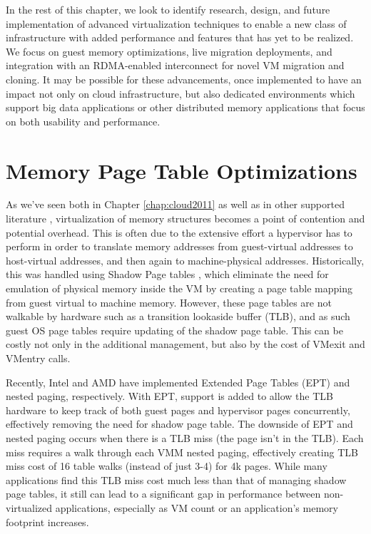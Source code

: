 In the rest of this chapter, we look to identify research, design, and future implementation of advanced virtualization techniques to enable a new class of infrastructure with added performance and features that has yet to be realized.  We focus on guest memory optimizations, live migration deployments, and integration with an RDMA-enabled interconnect for novel VM migration and cloning.  It may be possible for these advancements, once implemented to have an impact not only on cloud infrastructure, but also dedicated environments which support big data applications or other distributed memory applications that focus on both usability and performance. 

\section{Memory Page Table Optimizations}

As we've seen both in Chapter \ref{chap:cloud2011} as well as in other supported literature \cite{MagellanFinal}, virtualization of memory structures becomes a point of contention and potential overhead. This is often due to the extensive effort a hypervisor has to perform in order to translate memory addresses from guest-virtual addresses to host-virtual addresses, and then again to machine-physical addresses.  Historically, this was handled using Shadow Page tables \cite{rosenblum2005virtual}, which eliminate the need for emulation of physical memory inside the VM by creating a page table mapping from guest virtual to machine memory. However, these page tables are not walkable by hardware such as a transition lookaside buffer (TLB), and as such guest OS page tables require updating of the shadow page table. This can be costly not only in the additional management, but also by the cost of VMexit and VMentry calls.

Recently, Intel and AMD have implemented Extended Page Tables (EPT) and nested paging, respectively.  With EPT, support is added to allow the TLB hardware to keep track of both guest pages and hypervisor pages concurrently, effectively removing the need for shadow page table. The downside of EPT and nested paging occurs when there is a TLB miss (the page isn't in the TLB).  Each miss requires a walk through each VMM nested paging, effectively creating TLB miss cost of 16 table walks (instead of just 3-4) for 4k pages. While many applications find this TLB miss cost much less than that of managing shadow page tables, it still can lead to a significant gap in performance between non-virtualized applications, especially as VM count or an application's memory footprint increases. 

